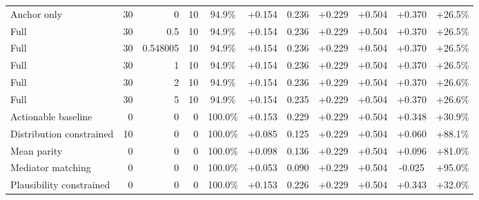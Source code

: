 \begin{table}[htbp]
\begin{tabular}{lrrrccccccc}
Anchor only & 30 & 0 & 10 & 94.9\% & +0.154 & 0.236 & +0.229 & +0.504 & +0.370 & +26.5\% \\
Full & 30 & 0.5 & 10 & 94.9\% & +0.154 & 0.236 & +0.229 & +0.504 & +0.370 & +26.5\% \\
Full & 30 & 0.548005 & 10 & 94.9\% & +0.154 & 0.236 & +0.229 & +0.504 & +0.370 & +26.5\% \\
Full & 30 & 1 & 10 & 94.9\% & +0.154 & 0.236 & +0.229 & +0.504 & +0.370 & +26.5\% \\
Full & 30 & 2 & 10 & 94.9\% & +0.154 & 0.236 & +0.229 & +0.504 & +0.370 & +26.6\% \\
Full & 30 & 5 & 10 & 94.9\% & +0.154 & 0.235 & +0.229 & +0.504 & +0.370 & +26.6\% \\
Actionable baseline & 0 & 0 & 0 & 100.0\% & +0.153 & 0.229 & +0.229 & +0.504 & +0.348 & +30.9\% \\
Distribution constrained & 10 & 0 & 0 & 100.0\% & +0.085 & 0.125 & +0.229 & +0.504 & +0.060 & +88.1\% \\
Mean parity & 0 & 0 & 0 & 100.0\% & +0.098 & 0.136 & +0.229 & +0.504 & +0.096 & +81.0\% \\
Mediator matching & 0 & 0 & 0 & 100.0\% & +0.053 & 0.090 & +0.229 & +0.504 & -0.025 & +95.0\% \\
Plausibility constrained & 0 & 0 & 0 & 100.0\% & +0.153 & 0.226 & +0.229 & +0.504 & +0.343 & +32.0\% \\
\bottomrule
\end{tabular}
\end{table}